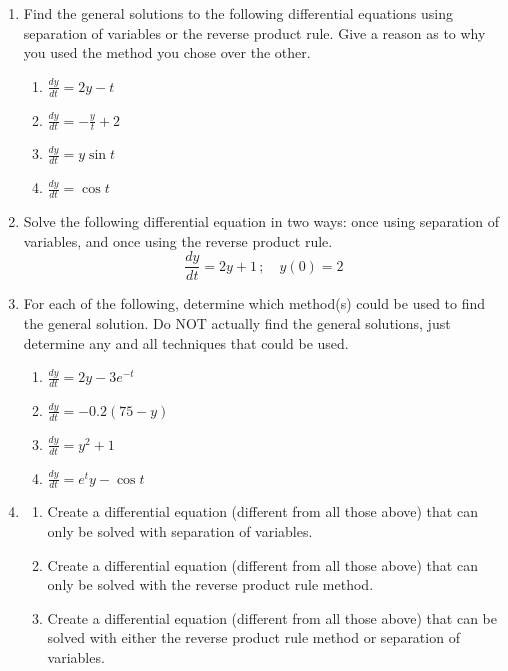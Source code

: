 \begin{enumerate}[resume]
\ee

\clearpage


\begin{enumerate}
\item Find the general solutions to the following differential equations using separation of variables or the reverse product rule.  Give a reason as to why you used the method you chose over the other. \label{06HWproblem1}

\begin{enumerate}
\item $\displaystyle \frac{dy}{dt}=2y-t$
\item $\displaystyle \frac{dy}{dt}=-\frac{y}{t}+2$
\item $\displaystyle \frac{dy}{dt}=y\sin t$
\item $\displaystyle \frac{dy}{dt}=\cos t$	
\end{enumerate}

\item Solve the following differential equation in two ways: once using separation of variables, and once using the reverse product rule. \label{06HWproblem2} 
\[ \frac{dy}{dt} = 2y+1\, ; \quad y(0)=2\]

\item	For each of the following, determine which method(s) could be used to find the general solution. Do NOT actually find the general solutions, just determine any and all techniques that could be used. \label{06HWproblem3}

\begin{enumerate}
\item $\displaystyle \frac{dy}{dt}=2y-3e^{-t}$
\item $\displaystyle \frac{dy}{dt}=-0.2(75-y)$
\item $\displaystyle \frac{dy}{dt}=y^2+1$
\item $\displaystyle \frac{dy}{dt}=e^t y-\cos t$
\end{enumerate}

\item \label{06HWproblem4}
\begin{enumerate}
\item Create a differential equation (different from all those above) that can only be solved with separation of variables.
\item	Create a differential equation (different from all those above) that can only be solved with the reverse product rule method.
\item	Create a differential equation (different from all those above) that can be solved with either the reverse product rule method or separation of variables.
\end{enumerate}


\end{enumerate}
\end{enumerate}
